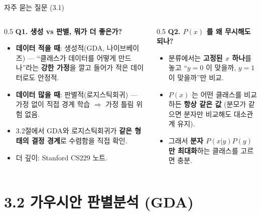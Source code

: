 \documentclass[aspectratio=169,11pt]{beamer}
\begin{document}
\begin{frame}{자주 묻는 질문 (3.1)}
  \begin{columns}[T]
    \begin{column}{0.5\textwidth}
      \textbf{Q1. 생성 vs 판별, 뭐가 더 좋은가?}
      \begin{itemize}
        \item \textbf{데이터 적을 때}: 생성적(GDA, 나이브베이즈) ---
          ``클래스가 데이터를 어떻게 만드나''라는 \textbf{강한 가정}을
          깔고 들어가 적은 데이터로도 안정적.
        \item \textbf{데이터 많을 때}: 판별적(로지스틱회귀) ---
          가정 없이 직접 경계 학습 $\Rightarrow$ 가정 틀림 위험 없음.
        \item 3.2절에서 GDA와 로지스틱회귀가 \textbf{같은 형태의
          결정 경계}로 수렴함을 직접 확인.
        \item 더 깊이: Stanford CS229 노트.
      \end{itemize}
    \end{column}
    \begin{column}{0.5\textwidth}
      \textbf{Q2. $P(x)$ 를 왜 무시해도 되나?}
      \begin{itemize}
        \item 분류에서는 \textbf{고정된 $x$ 하나}를 놓고
          ``$y=0$ 이 맞을까, $y=1$ 이 맞을까''만 비교.
        \item $P(x)$ 는 어떤 클래스를 비교하든 \textbf{항상 같은 값}
          (분모가 같으면 분자만 비교해도 대소관계 유지).
        \item 그래서 \textbf{분자 $P(x|y)P(y)$ 만 최대화}하는 클래스를
          고르면 충분.
      \end{itemize}
    \end{column}
  \end{columns}
\end{frame}

\section{3.2 가우시안 판별분석 (GDA)}
\end{document}
